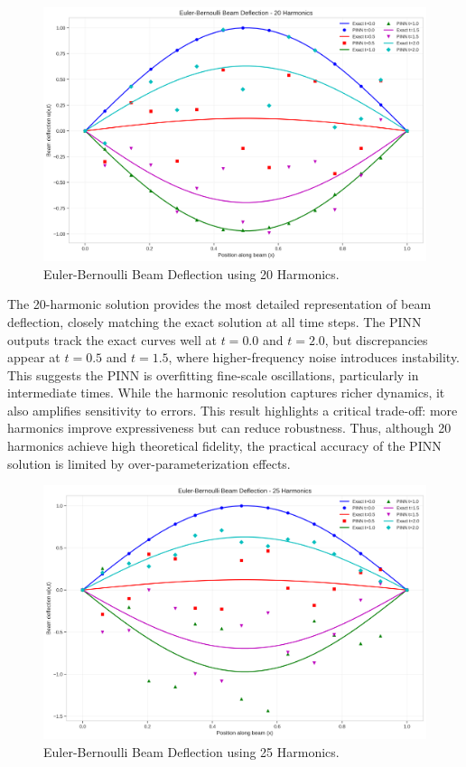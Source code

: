 \documentclass[preprint,12pt]{elsarticle}
\begin{document}
\begin{figure}[t]
    \centering
    \includegraphics[width=0.9\linewidth]{figures/euler_bernoulli_beam_20h.png}
    \caption{Euler-Bernoulli Beam Deflection using 20 Harmonics.}
    \label{fig:beam_deflection_20h}
\end{figure}

The 20-harmonic solution provides the most detailed representation of beam deflection, closely matching the exact solution at all time steps. The PINN outputs track the exact curves well at $t=0.0$ and $t=2.0$, but discrepancies appear at $t=0.5$ and $t=1.5$, where higher-frequency noise introduces instability. This suggests the PINN is overfitting fine-scale oscillations, particularly in intermediate times. While the harmonic resolution captures richer dynamics, it also amplifies sensitivity to errors. This result highlights a critical trade-off: more harmonics improve expressiveness but can reduce robustness. Thus, although 20 harmonics achieve high theoretical fidelity, the practical accuracy of the PINN solution is limited by over-parameterization effects.

\begin{figure}[t]
    \centering
    \includegraphics[width=0.9\linewidth]{figures/euler_bernoulli_beam_25h.png}
    \caption{Euler-Bernoulli Beam Deflection using 25 Harmonics.}
    \label{fig:beam_deflection_25h}
\end{figure}
\end{document}
